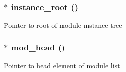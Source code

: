 \subsubsection{$\ast$ instance\_\-root ()}\label{toggle_8c_a0}


Pointer to root of module instance tree 
\subsubsection{$\ast$ mod\_\-head ()}\label{toggle_8c_a1}


Pointer to head element of module list 